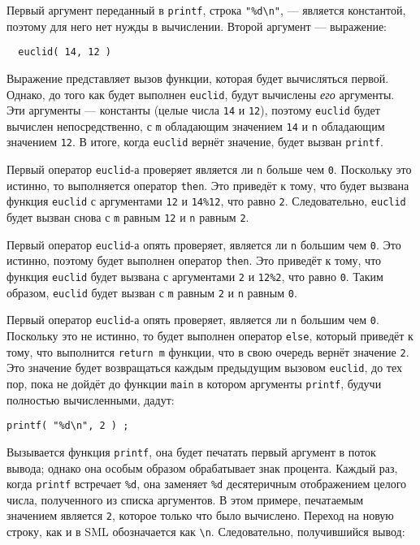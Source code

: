 Первый аргумент переданный в \lstinline|printf|, строка \lstinline|"%d\n"|, --- является константой, поэтому для него нет нужды в вычислении. Второй аргумент --- выражение:

\begin{lstlisting}
  euclid( 14, 12 )
\end{lstlisting}

Выражение представляет вызов функции, которая будет вычисляться первой. Однако, до того как будет выполнен \lstinline|euclid|, будут вычислены \emph{его} аргументы. Эти аргументы --- константы (целые числа \lstinline|14| и \lstinline|12|), поэтому \lstinline|euclid| будет вычислен непосредственно, с \lstinline|m| обладающим значением \lstinline|14| и \lstinline|n| обладающим значением \lstinline|12|. В итоге, когда \lstinline|euclid| вернёт значение, будет вызван \lstinline|printf|.

Первый оператор \lstinline|euclid|-а проверяет является ли \lstinline|n| больше чем \lstinline|0|. Поскольку это истинно, то выполняется оператор \lstinline|then|. Это приведёт к тому, что будет вызвана функция \lstinline|euclid| с аргументами \lstinline|12| и \lstinline|14%12|, что равно \lstinline|2|. Следовательно, \lstinline|euclid| будет вызван снова с \lstinline|m| равным \lstinline|12| и \lstinline|n| равным \lstinline|2|.

Первый оператор \lstinline|euclid|-а опять проверяет, является ли \lstinline|n| большим чем \lstinline|0|. Это истинно, поэтому будет выполнен оператор \lstinline|then|. Это приведёт к тому, что функция \lstinline|euclid| будет вызвана с аргументами \lstinline|2| и \lstinline|12%2|, что равно \lstinline|0|. Таким образом, \lstinline|euclid| будет вызван с \lstinline|m| равным \lstinline|2| и \lstinline|n| равным \lstinline|0|.

Первый оператор \lstinline|euclid|-а опять проверяет, является ли \lstinline|n| большим чем \lstinline|0|. Поскольку это не истинно, то будет выполнен оператор \lstinline|else|, который приведёт к тому, что выполнится \lstinline|return m| функции, что в свою очередь вернёт значение \lstinline|2|. Это значение будет возвращаться каждым предыдущим вызовом \lstinline|euclid|, до тех пор, пока не дойдёт до функции \lstinline|main| в котором аргументы \lstinline|printf|, будучи полностью вычисленными, дадут:

\begin{lstlisting}
printf( "%d\n", 2 ) ;
\end{lstlisting}

Вызывается функция \lstinline|printf|, она будет печатать первый аргумент в поток вывода; однако она особым образом обрабатывает знак процента. Каждый раз, когда \lstinline|printf| встречает \lstinline|%d|, она заменяет \lstinline|%d| десятеричным отображением целого числа, полученного из списка аргументов. В этом примере, печатаемым значением является \lstinline|2|, которое только что было вычислено. Переход на новую строку, как и в SML обозначается как \lstinline|\n|. Следовательно, получившийся вывод:

